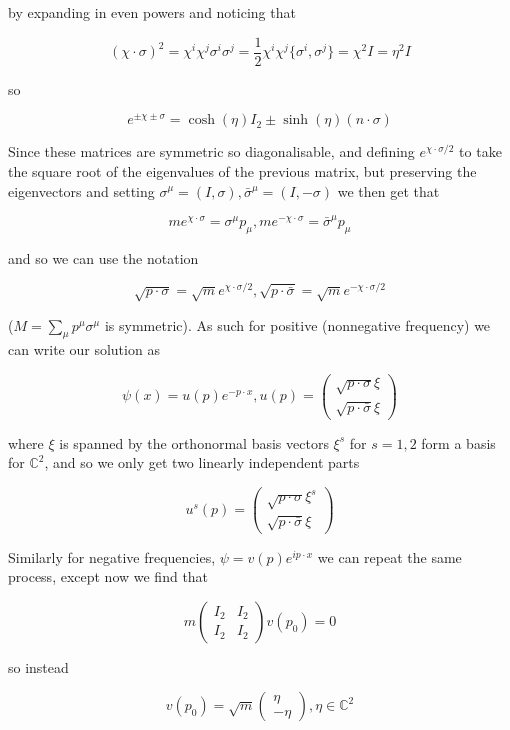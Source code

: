 \documentclass{article}
\theoremstyle{definition}
\begin{document}
by expanding in even powers and noticing that

$$ (\chi \cdot \sigma)^2 = \chi^i \chi^j \sigma^i \sigma^j = \frac{1}{2} \chi^i
\chi^j \{\sigma^i, \sigma^j \} = \chi^2 I = \eta^2 I $$

so

$$ e^{\pm \chi \pm \sigma} = \cosh(\eta) I_2 \pm \sinh(\eta) (n \cdot \sigma) $$

Since these matrices are symmetric so diagonalisable, and defining $e^{\chi
  \cdot \sigma / 2}$ to take the square root of the eigenvalues of the previous
matrix, but preserving the eigenvectors and setting $\sigma^\mu = (I, \sigma),
\bar{\sigma}^\mu = (I, -\sigma)$ we then get that

$$ me^{\chi \cdot \sigma} = \sigma^\mu p_\mu, me^{-\chi \cdot \sigma} =
\bar{\sigma}^\mu p_\mu $$

and so we can use the notation

$$ \sqrt{p \cdot \sigma} = \sqrt{m} e^{\chi \cdot \sigma / 2}, \sqrt{p \cdot
  \bar{\sigma}} = \sqrt{m} e^{-\chi \cdot \sigma / 2} $$

($M = \sum_\mu p^\mu \sigma^\mu$ is symmetric). As such for positive
(nonnegative frequency) we can write our solution as

$$ \psi(x) = u(p) e^{-p \cdot x}, u(p) =
\begin{pmatrix}
  \sqrt{p \cdot \sigma} \xi \\
  \sqrt{p \cdot \bar{\sigma}} \xi
\end{pmatrix} $$

where $\xi$ is spanned by the orthonormal basis vectors $\xi^s$ for $s = 1, 2$
form a basis for $\mathbb{C}^2$, and so we only get two linearly independent
parts

$$ u^s(p) =
\begin{pmatrix}
  \sqrt{p \cdot \sigma} \xi^s \\
  \sqrt{p \cdot \bar{\sigma}} \xi
\end{pmatrix} $$

Similarly for negative frequencies, $\psi = v(p) e^{ip \cdot x}$ we can repeat
the same process, except now we find that

$$ m
\begin{pmatrix}
  I_2 & I_2 \\
  I_2 & I_2
\end{pmatrix} v(p_0) = 0 $$

so instead

$$ v(p_0) = \sqrt{m}
\begin{pmatrix}
  \eta \\
  -\eta
\end{pmatrix}, \eta \in \mathbb{C}^2 $$
\end{document}
